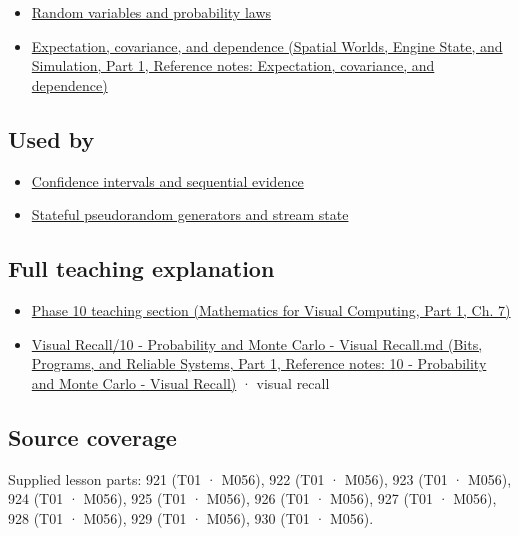 \hypertarget{appendix-a2360b435383-prerequisites}{}

\begin{itemize}
\tightlist
\item
  \hyperref[appendix-4d0203f7944f]{Random variables and probability laws}
\item
  \href{../05-Spatial-Worlds-Engine-State-and-Simulation-P01/main.pdf\#nameddest=appendix-54c383df9992}{Expectation, covariance, and dependence (Spatial Worlds, Engine State, and Simulation, Part 1, Reference notes: Expectation, covariance, and dependence)}
\end{itemize}

\subsection{Used by}\label{appendix-a2360b435383-used-by}

\hypertarget{appendix-a2360b435383-used-by}{}

\begin{itemize}
\tightlist
\item
  \hyperref[appendix-c83016554b1e]{Confidence intervals and sequential evidence}
\item
  \hyperref[appendix-e0f7c7e08f3a]{Stateful pseudorandom generators and stream state}
\end{itemize}

\subsection{Full teaching explanation}\label{appendix-a2360b435383-full-teaching-explanation}

\hypertarget{appendix-a2360b435383-full-teaching-explanation}{}

\begin{itemize}
\tightlist
\item
  \href{../02-Mathematics-for-Visual-Computing-P01/main.pdf\#nameddest=02-foundations-ii-ch023-discrete-and-continuous-distribution-families}{Phase 10 teaching section (Mathematics for Visual Computing, Part 1, Ch. 7)}
\item
  \href{../01-Bits-Programs-and-Reliable-Systems-P01/main.pdf\#nameddest=appendix-cb5af353ef77}{Visual Recall/10 - Probability and Monte Carlo - Visual Recall.md (Bits, Programs, and Reliable Systems, Part 1, Reference notes: 10 - Probability and Monte Carlo - Visual Recall)} · visual recall
\end{itemize}

\subsection{Source coverage}\label{appendix-a2360b435383-source-coverage}

\hypertarget{appendix-a2360b435383-source-coverage}{}

Supplied lesson parts: 921 (T01 · M056), 922 (T01 · M056), 923 (T01 · M056), 924 (T01 · M056), 925 (T01 · M056), 926 (T01 · M056), 927 (T01 · M056), 928 (T01 · M056), 929 (T01 · M056), 930 (T01 · M056).
